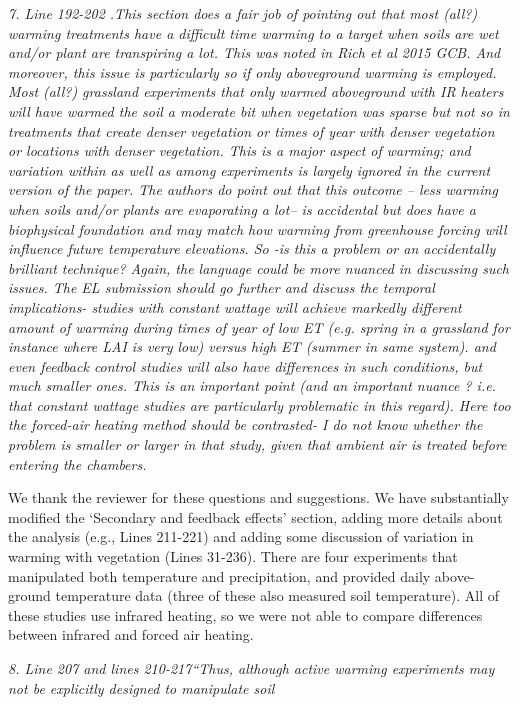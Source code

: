 \documentclass[11pt,a4paper]{letter}
\begin{document}
\begin{letter}{}
\par \emph{7. Line 192-202 .This section does a fair job of pointing out that most (all?) warming treatments have a difficult time warming to a target when soils are wet and/or plant are transpiring a lot. This was noted in Rich et al 2015 GCB. And moreover, this issue is particularly so if only aboveground warming is employed. Most (all?) grassland experiments that only warmed aboveground with IR heaters will have warmed the soil a moderate bit when vegetation was sparse but not so in treatments that create denser vegetation or times of year with denser vegetation or locations with denser vegetation. This is a major aspect of warming; and variation within as well as among experiments is largely ignored in the current version of the paper. The authors do point out that this outcome -- less warming when soils and/or plants are evaporating a lot-- is accidental but does have a biophysical foundation and may match how warming from greenhouse forcing will influence future temperature elevations. So -is this a problem or an accidentally brilliant technique? Again, the language could be more nuanced in discussing such issues. The EL submission should go further and discuss the temporal implications- studies with constant wattage will achieve markedly different amount of warming during times of year of low ET (e.g. spring in a grassland for instance where LAI is very low) versus high ET (summer in same system). and even feedback control studies will also have differences in such conditions, but much smaller ones. This is an important point (and an important nuance ? i.e. that constant wattage studies are particularly problematic in this regard). Here too the forced-air heating method should be contrasted- I do not know whether the problem is smaller or larger in that study, given that ambient air is treated before entering the chambers.}
\par We thank the reviewer for these questions and suggestions. We have substantially modified the `Secondary and feedback effects' section, adding more details about the analysis (e.g., Lines 211-221) and adding some discussion of variation in warming with vegetation (Lines 31-236).  There are four experiments that manipulated both temperature and precipitation, and provided daily above-ground temperature data (three of these also measured soil temperature). All of these studies use infrared heating, so we were not able to compare differences  between infrared and forced air heating.
\\
\par \emph{8. Line 207 and lines 210-217``Thus, although active warming experiments may not be explicitly designed to manipulate soil
}
\end{letter}
\end{document}
